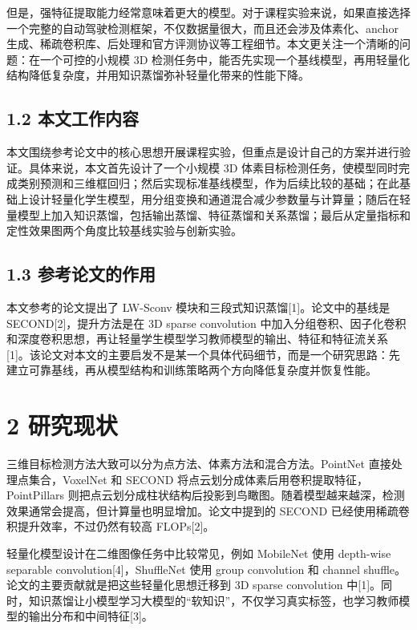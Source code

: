 \documentclass[UTF8]{ctexart}
\begin{document}
但是，强特征提取能力经常意味着更大的模型。对于课程实验来说，如果直接选择一个完整的自动驾驶检测框架，不仅数据量很大，而且还会涉及体素化、anchor 生成、稀疏卷积库、后处理和官方评测协议等工程细节。本文更关注一个清晰的问题：在一个可控的小规模 3D 检测任务中，能否先实现一个基线模型，再用轻量化结构降低复杂度，并用知识蒸馏弥补轻量化带来的性能下降。


\subsection{1.2 本文工作内容}

本文围绕参考论文中的核心思想开展课程实验，但重点是设计自己的方案并进行验证。具体来说，本文首先设计了一个小规模 3D 体素目标检测任务，使模型同时完成类别预测和三维框回归；然后实现标准基线模型，作为后续比较的基础；在此基础上设计轻量化学生模型，用分组变换和通道混合减少参数量与计算量；随后在轻量模型上加入知识蒸馏，包括输出蒸馏、特征蒸馏和关系蒸馏；最后从定量指标和定性效果图两个角度比较基线实验与创新实验。


\subsection{1.3 参考论文的作用}

本文参考的论文提出了 LW-Sconv 模块和三段式知识蒸馏[1]。论文中的基线是 SECOND[2]，提升方法是在 3D sparse convolution 中加入分组卷积、因子化卷积和深度卷积思想，再让轻量学生模型学习教师模型的输出、特征和特征流关系[1]。该论文对本文的主要启发不是某一个具体代码细节，而是一个研究思路：先建立可靠基线，再从模型结构和训练策略两个方向降低复杂度并恢复性能。


\section{2 研究现状}

三维目标检测方法大致可以分为点方法、体素方法和混合方法。PointNet 直接处理点集合，VoxelNet 和 SECOND 将点云划分成体素后用卷积提取特征，PointPillars 则把点云划分成柱状结构后投影到鸟瞰图。随着模型越来越深，检测效果通常会提高，但计算量也明显增加。论文中提到的 SECOND 已经使用稀疏卷积提升效率，不过仍然有较高 FLOPs[2]。


轻量化模型设计在二维图像任务中比较常见，例如 MobileNet 使用 depth-wise separable convolution[4]，ShuffleNet 使用 group convolution 和 channel shuffle。论文的主要贡献就是把这些轻量化思想迁移到 3D sparse convolution 中[1]。同时，知识蒸馏让小模型学习大模型的“软知识”，不仅学习真实标签，也学习教师模型的输出分布和中间特征[3]。
\end{document}
